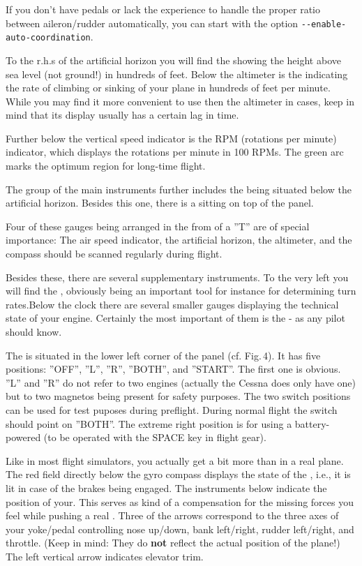 If you don't have pedals or lack the experience to handle the proper ratio between aileron/rudder automatically, you can start
\FlightGear{} with the option \texttt{-$ $-enable-auto-coordination}.

To the r.h.s of the artificial horizon you will find the  showing the height
above sea level (not ground!) in hundreds of feet.  Below the altimeter is the
 indicating the rate of climbing or sinking of your plane
in hundreds of feet per minute. While you may find it more convenient to use then the
altimeter in cases, keep in mind that its display usually has a certain lag in time.

Further below the vertical speed indicator is the RPM (rotations per minute)
indicator, which displays the rotations per minute  in 100 RPMs. The
green arc marks the optimum region for long-time flight.

The group of the main instruments further includes the  being
situated below the artificial horizon. Besides this one, there is a  sitting on top of the panel.

Four of these gauges being arranged in the from of a ''T'' are of special importance: The
air speed indicator, the artificial horizon, the altimeter, and the compass should be
scanned regularly during flight.

Besides these, there are several supplementary instruments. To the very left you will find the
, obviously being an important tool for instance for determining turn rates.Below the clock there are several smaller gauges displaying the technical state of your engine. Certainly the most important of them is the  - as any pilot should know.

The  is situated in the lower left corner of the panel (cf. Fig.\,4). It has five positions: ''OFF'', ''L'', ''R'', ''BOTH'', and ''START''. The first one is obvious. ''L'' and ''R'' do not refer to two engines (actually the Cessna does only have one) but to two magnetos being present for safety purposes. The two switch positions can be used for test puposes during preflight. During normal flight the switch should point on ''BOTH''. The extreme right position is for  using a battery-powered  (to be operated with the SPACE key in flight gear). 

Like in most flight simulators, you actually get a bit more than in a real plane. The red field directly below the gyro compass displays the state of the , i.e., it is lit in case of the brakes being engaged. The instruments below indicate the position of your. This serves as kind of a compensation for the missing forces you feel while pushing a real . Three of the arrows correspond to the three axes of your yoke/pedal controlling nose up/down, bank left/right, rudder left/right, and throttle. (Keep in mind: They do \textbf{not} reflect the actual position of the plane!) The left vertical arrow indicates elevator trim. 

